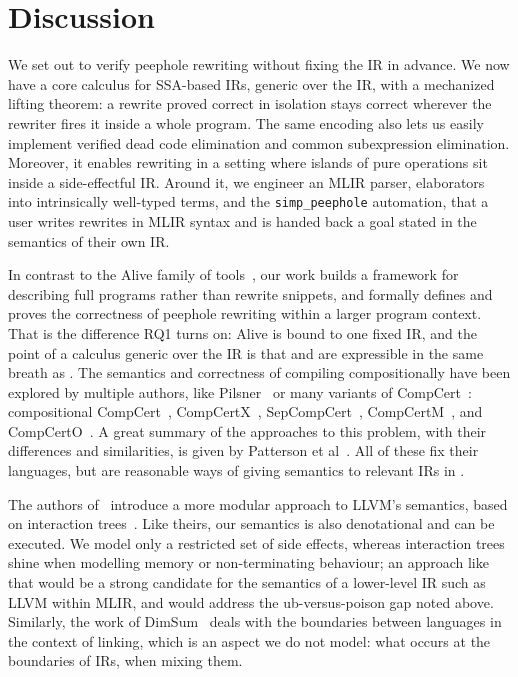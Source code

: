 \section{Discussion}
\label{sec:mlir:discussion}

We set out to verify peephole rewriting without fixing the IR in advance.
We now have a core calculus for SSA-based IRs, generic over the IR,
with a mechanized lifting theorem: a rewrite proved correct in isolation stays correct wherever the rewriter fires it inside a whole program.
The same encoding also lets us easily implement verified dead code elimination and common subexpression
elimination.
Moreover, it enables rewriting in a setting where islands of pure operations sit inside a side-effectful IR.
Around it, we engineer an MLIR parser, elaborators into intrinsically well-typed terms,
and the \texttt{simp\_peephole} automation, that a user writes rewrites in MLIR
syntax and is handed back a goal stated in the semantics of their own IR.

In contrast to the Alive family of
tools~\citep{lopes2015provably,lopes2021alive2,lee2019aliveinlean}, our work
builds a framework for describing full programs rather than rewrite snippets,
and formally defines and proves the correctness of peephole rewriting within a
larger program context. That is the difference RQ1 turns on: Alive is bound to
one fixed IR, and the point of a calculus generic over the IR is that
 and  are expressible in the
same breath as . The semantics and correctness of
compiling compositionally have been explored by multiple authors, like
Pilsner~\cite{neis2015pilsner} or many variants of
CompCert~\cite{leroy2016compcert}: compositional
CompCert~\cite{stewart2015compositional}, CompCertX~\cite{wang2019abstract},
SepCompCert~\cite{kang2016lightweight}, CompCertM~\cite{song2019compcertm}, and
CompCertO~\cite{koenig2021compcerto}. A great summary of the approaches to this
problem, with their differences and similarities, is given by Patterson et
al~\cite{patterson2019next}. All of these fix their languages, but are
reasonable ways of giving semantics to relevant IRs in .

The authors of~\cite{zakowski2021modular} introduce a more modular approach to
LLVM's semantics, based on interaction trees~\cite{xia2019interaction}. Like
theirs, our semantics is also denotational and can be executed. We model only a
restricted set of side effects, whereas interaction trees shine when modelling
memory or non-terminating behaviour; an approach like that would be a strong
candidate for the semantics of a lower-level IR such as LLVM within MLIR, and
would address the ub-versus-poison gap noted above. Similarly, the work of
DimSum~\cite{sammler2023dimsum} deals with the boundaries between languages in
the context of linking, which is an aspect we do not model: what occurs at the
boundaries of IRs, when mixing them.

